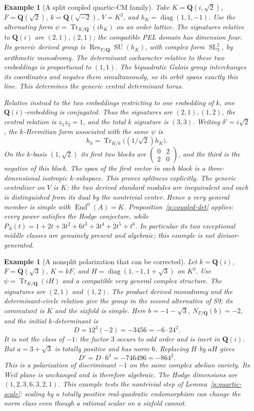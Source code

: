 \documentclass[11pt,reqno]{article}
\theoremstyle{emphasizedplain}
\theoremstyle{emphasizeddefinition}
\newtheorem{example}[theorem]{Example}
\theoremstyle{emphasizeddefinition}
\DeclareMathOperator{\End}{End}
\DeclareMathOperator{\SL}{SL}
\DeclareMathOperator{\SU}{SU}
\DeclareMathOperator{\Res}{Res}
\DeclareMathOperator{\Tr}{Tr}
\newcommand{\Q}{\mathbf Q}
\begin{document}
\begin{example}[A split coupled quartic-CM family]
Take $K=\Q(i,\sqrt2)$, $F=\Q(\sqrt2)$, $k=\Q(\sqrt{-2})$,
$V=K^3$, and $h_K=\operatorname{diag}(1,1,-1)$. Use the alternating form
$\psi=\Tr_{K/\Q}(i h_K)$ on an order lattice. The signatures relative
to $\Q(i)$ are $(2,1),(2,1)$; the compatible PEL domain has dimension
four. Its generic derived group is $\Res_{F/\Q}\SU(h_K)$, with complex
form $\SL_3^2$, by arithmetic monodromy. The determinant cocharacter
relative to these two embeddings is proportional to $(1,1)$. The
biquadratic Galois group interchanges its coordinates and negates them
simultaneously, so its orbit spans exactly this line. This determines the
generic central determinant torus.

Relative instead to the two embeddings restricting to one embedding of
$k$, one $\Q(i)$-embedding is conjugated. Thus the signatures are
$(2,1),(1,2)$, the central relation is $z_1z_2=1$, and the total $k$
signature is $(3,3)$. Writing $\delta'=i\sqrt2$, the $k$-Hermitian form
associated with the same $\psi$ is
\[
 h_k=\Tr_{K/k}\bigl((1/\sqrt2)h_K\bigr).
\]
On the $k$-basis $(1,\sqrt2)$ its first two blocks are
$\left(\begin{smallmatrix}0&2\\2&0\end{smallmatrix}\right)$, and the
third is the negative of this block. The span of the first vector in each
block is a three-dimensional isotropic $k$-subspace. This proves splitness
explicitly. The generic centralizer on $V$ is $K$: the two derived
standard modules are inequivalent and each is distinguished from its dual
by the nontrivial center. Hence a very general member is simple with
$\End^0(A)=K$. Proposition~\ref{p:coupled-det} applies: every power
satisfies the Hodge conjecture, while
$P_A(t)=1+2t+3t^2+6t^3+3t^4+2t^5+t^6$.
In particular its two exceptional middle classes are genuinely present
and algebraic; this example is not divisor-generated.
\end{example}

\begin{example}[A nonsplit polarization that can be corrected]
Let $k=\Q(i)$, $F=\Q(\sqrt3)$, $K=kF$, and
$H=\operatorname{diag}(1,-1,1+\sqrt3)$ on $K^3$.
Use $\psi=\Tr_{K/\Q}(iH)$ and a compatible very general complex structure.
The signatures are $(2,1)$ and $(1,2)$. The product derived monodromy
and the determinant-circle relation give the group in the second
alternative of S9; its commutant is $K$ and the sixfold is simple.
Here $b=-1-\sqrt3$, $N_{F/\Q}(b)=-2$, and the initial $k$-determinant is
\[
 D=12^3(-2)=-3456=-6\cdot24^2.
\]
It is not the class of $-1$: the factor $3$ occurs to odd order and
is inert in $\Q(i)$. But $a=3+\sqrt3$ is totally positive and has
norm $6$. Replacing $H$ by $aH$ gives
\[
 D'=D\cdot6^3=-746496=-864^2.
\]
This is a polarization of discriminant $-1$ on the same complex abelian
variety. Its Weil plane is unchanged and is therefore algebraic.
The Hodge dimensions are $(1,2,3,6,3,2,1)$.
This example tests the nontrivial step of Lemma~\ref{p:quartic-scale}:
scaling by a totally positive real-quadratic endomorphism can change
the norm class even though a rational scalar on a sixfold cannot.
\end{example}
\end{document}
